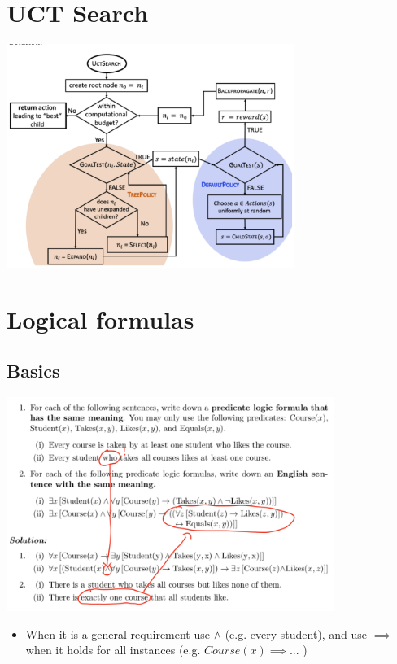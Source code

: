 \documentclass[conference]{styles/acmsiggraph}
\begin{document}

\section{UCT Search}

\includegraphics[width=0.7\textwidth]{uct.png}

\pagebreak
\section{Logical formulas}

\subsection{Basics}

\includegraphics[width=0.8\textwidth]{imgs/basics.png}

\begin{itemize}
    \item When it is a general requirement use $\land$ (e.g. every student), and use $\implies$ when it holds for all instances (e.g. $Course(x) \implies ... $ )
\end{itemize}
\end{document}
